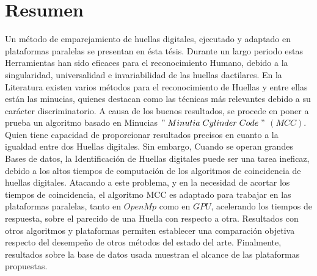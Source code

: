 \section*{Resumen}

Un método de emparejamiento de huellas digitales, ejecutado y adaptado en plataformas paralelas se presentan en ésta tésis. Durante un largo periodo estas Herramientas han sido eficaces para el reconocimiento Humano, debido a la singularidad, universalidad e invariabilidad de las huellas dactilares. En la Literatura existen varios métodos para el reconocimiento de Huellas y entre ellas están las minucias, quienes  destacan como las técnicas más relevantes debido a su carácter discriminatorio. A causa de los buenos resultados, se procede en poner a prueba un algoritmo basado en Minucias $"\; Minutia\;Cylinder\;Code\;"$ $(MCC)$. Quien tiene capacidad de proporcionar resultados precisos en cuanto a la igualdad entre dos Huellas digitales. Sin embargo, Cuando se operan grandes Bases de datos, la Identificación de Huellas digitales puede ser una tarea ineficaz, debido a los altos tiempos de computación de los algoritmos de coincidencia de huellas digitales. Atacando a este problema, y en la necesidad de acortar los tiempos de coincidencia, el algoritmo MCC es adaptado para trabajar en las plataformas paralelas, tanto en $OpenMp$ como en $GPU$, acelerando los tiempos de respuesta, sobre el parecido de una Huella con respecto a otra. Resultados con otros algoritmos y plataformas permiten establecer una comparación objetiva respecto del desempeño de otros métodos del estado del arte. Finalmente, resultados sobre la base de datos usada muestran el alcance de las plataformas propuestas.



